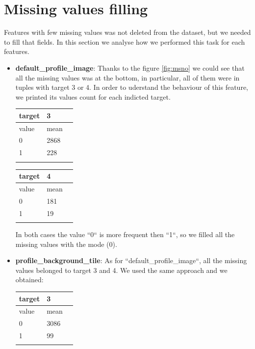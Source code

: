 \section{Missing values filling}
Features with few missing values was not deleted from the dataset, but we needed to fill that fields.
In this section we analyse how we performed this task for each features.
\begin{itemize}
	\item[\PencilRight]\textbf{default\_profile\_image}: Thanks to the figure \ref{fig:msno} we could see that all the missing values was at the bottom, in particular, all of them were in tuples with target 3 or 4. In order to uderstand the behaviour of this feature, we printed its values count for each indicted target.
	\begin{center}
		\begin{tabular}{lll}
			\\target&3\\
			\hline\hline
			value&mean\\
			\hline\hline
			0&2868\\
			1&228\\\hline\\
		\end{tabular}
		
		\begin{tabular}{lll}
			\\target&4\\
			\hline\hline
			value&mean\\
			\hline\hline
			0&181\\
			1&19\\\hline\\
		\end{tabular}
	\end{center}
	
	In both cases the value ``0`` is more frequent then ``1``, so we filled all the missing values with the mode (0).
	
	\item[\PencilRight]\textbf{profile\_background\_tile}: As for ``default\_profile\_image``, all the missing values belonged to target 3 and 4. We used the same approach and we obtained:
	\begin{center}
		\begin{tabular}{lll}
			\\target&3\\
			\hline\hline
			value&mean\\
			\hline\hline
			0&3086\\
			1&99\\\hline\\
		\end{tabular}
		

\end{center}
\end{itemize}
